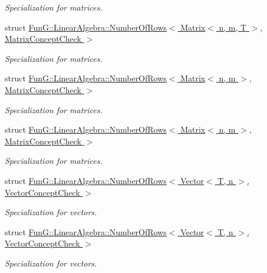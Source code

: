 \begin{DoxyCompactItemize}
\begin{DoxyCompactList}\small\item\em \-Specialization for matrices. \end{DoxyCompactList}\item 
struct \hyperlink{structFunG_1_1LinearAlgebra_1_1NumberOfRows_3_01Matrix_3_01n_00_01m_00_01T_01_4_00_01MatrixConceptCheck_01_4}{\-Fun\-G\-::\-Linear\-Algebra\-::\-Number\-Of\-Rows$<$ Matrix$<$ n, m, T $>$, Matrix\-Concept\-Check $>$}
\begin{DoxyCompactList}\small\item\em \-Specialization for matrices. \end{DoxyCompactList}\item 
struct \hyperlink{structFunG_1_1LinearAlgebra_1_1NumberOfRows_3_01Matrix_3_01n_00_01m_01_4_00_01MatrixConceptCheck_01_4}{\-Fun\-G\-::\-Linear\-Algebra\-::\-Number\-Of\-Rows$<$ Matrix$<$ n, m $>$, Matrix\-Concept\-Check $>$}
\begin{DoxyCompactList}\small\item\em \-Specialization for matrices. \end{DoxyCompactList}\item 
struct \hyperlink{structFunG_1_1LinearAlgebra_1_1NumberOfRows_3_01Matrix_3_01n_00_01m_01_4_00_01MatrixConceptCheck_01_4}{\-Fun\-G\-::\-Linear\-Algebra\-::\-Number\-Of\-Rows$<$ Matrix$<$ n, m $>$, Matrix\-Concept\-Check $>$}
\begin{DoxyCompactList}\small\item\em \-Specialization for matrices. \end{DoxyCompactList}\item 
struct \hyperlink{structFunG_1_1LinearAlgebra_1_1NumberOfRows_3_01Vector_3_01T_00_01n_01_4_00_01VectorConceptCheck_01_4}{\-Fun\-G\-::\-Linear\-Algebra\-::\-Number\-Of\-Rows$<$ Vector$<$ T, n $>$, Vector\-Concept\-Check $>$}
\begin{DoxyCompactList}\small\item\em \-Specialization for vectors. \end{DoxyCompactList}\item 
struct \hyperlink{structFunG_1_1LinearAlgebra_1_1NumberOfRows_3_01Vector_3_01T_00_01n_01_4_00_01VectorConceptCheck_01_4}{\-Fun\-G\-::\-Linear\-Algebra\-::\-Number\-Of\-Rows$<$ Vector$<$ T, n $>$, Vector\-Concept\-Check $>$}
\begin{DoxyCompactList}\small\item\em \-Specialization for vectors. \end{DoxyCompactList}\item 

\end{DoxyCompactItemize}
